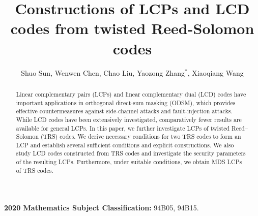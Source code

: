 \documentclass[12pt,draftcls,journal,onecolumn]{IEEEtran}
\begin{document}
%
\title{ Constructions of LCPs and LCD codes from twisted Reed-Solomon codes
}
\author{Shuo Sun, Wenwen Chen, Chao Liu, Yaozong Zhang$^{*}$, Xiaoqiang Wang
}

\renewcommand{\thefootnote}{\empty}%


\maketitle


\begin{abstract}
Linear complementary pairs (LCPs) and linear complementary dual (LCD) codes have important applications in orthogonal direct-sum masking (ODSM), which provides effective countermeasures against side-channel attacks and fault-injection attacks. While LCD codes have been extensively investigated, comparatively fewer results are available for general LCPs. In this paper, we further investigate LCPs of twisted Reed--Solomon (TRS) codes. We derive necessary conditions for two TRS codes to form an LCP and establish several sufficient conditions and explicit constructions. We also study LCD codes constructed from TRS codes and investigate the security parameters of the resulting LCPs. Furthermore, under suitable conditions, we obtain MDS LCPs of TRS codes.
\end{abstract}



%
\textbf{2020 Mathematics Subject Classification:} 94B05, 94B15.
\end{document}
